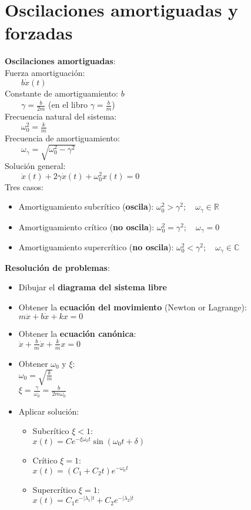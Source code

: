 \documentclass[a4paper,landscape,10pt]{cheatsheet}
\begin{document}
\section{Oscilaciones amortiguadas y forzadas}
\textbf{Oscilaciones amortiguadas}:\\
Fuerza amortiguación:\\
$\qquad b\dot{x}(t)$\\
Constante de amortiguamiento: $b$\\
$\qquad \gamma = \frac{b}{2m}$ (en el libro $\gamma = \frac{b}{m}$)\\
Frecuencia natural del sistema:\\
$\qquad \omega_0^2 = \frac{k}{m}$\\
Frecuencia de amortiguamiento:\\
$\qquad \omega_\gamma = \sqrt{\omega_0^2-\gamma^2}$\\
Solución general:\\
$\qquad \ddot{x}(t) + 2\gamma\dot{x}(t) + \omega_0^2x(t) = 0$\\
Tres casos:\\
\begin{itemize}
  \item Amortiguamiento subcrítico (\textbf{oscila}): $\omega_0^2>\gamma^2;\quad\omega_\gamma\in\mathbb{R}$
  \item Amortiguamiento crítico (\textbf{no oscila}): $\omega_0^2=\gamma^2;\quad\omega_\gamma=0$
  \item Amortiguamiento supercrítico (\textbf{no oscila}): $\omega_0^2<\gamma^2;\quad\omega_\gamma\in\mathbb{C}$
\end{itemize}

\textbf{Resolución de problemas}:
\begin{itemize}
  \item Dibujar el \textbf{diagrama del sistema libre}
  \item Obtener la \textbf{ecuación del movimiento} (Newton or Lagrange):\\
        $m\ddot{x}+b\dot{x}+kx=0$
  \item Obtener la \textbf{ecuación canónica}:\\
        $\ddot{x}+\frac{b}{m}\dot{x}+\frac{k}{m}x=0$
  \item Obtener $\omega_0$ y $\xi$:\\
        $\omega_0=\sqrt{\frac{k}{m}}$\\
        $\xi=\frac{\gamma}{\omega_0}=\frac{b}{2m\omega_0}$
  \item Aplicar solución:
        \begin{itemize}
          \item Subcrítico $\xi<1$:\\
                $x(t)=Ce^{-\xi \omega_0t}\sin\left(\omega_0t+\delta\right)$
          \item Crítico $\xi=1$:\\
                $x(t)=(C_1+C_2t)e^{-\omega_0t}$
          \item Supercrítico $\xi=1$:\\
                $x(t)=C_1e^{-\vert\lambda_1\vert t}+C_2e^{-\vert\lambda_2\vert t}$
        \end{itemize}
\end{itemize}
\end{document}
